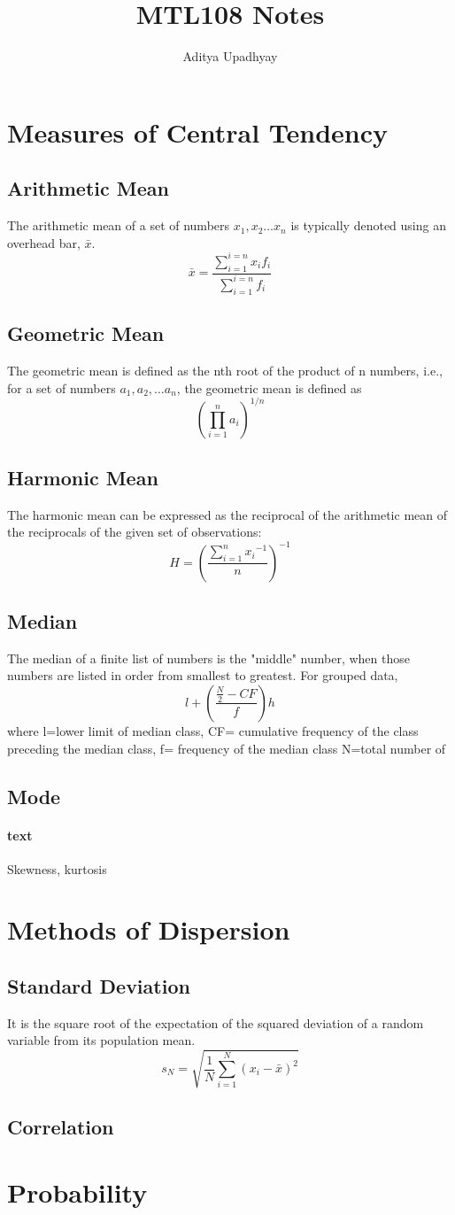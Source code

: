 \documentclass[12pt]{article}
\title{MTL108 Notes}
\author{Aditya Upadhyay}
\date{}
\begin{document}
\maketitle
\section{Measures of Central Tendency}
\subsection{Arithmetic Mean}
The arithmetic mean of a set of numbers $x_1, x_2 \dots x_n$ is typically denoted using an overhead bar, $\bar {x}$.
\[\bar{x} = \frac{ \sum_{i=1}^{i=n} {x_i}{f_i} }{\sum_{i=1}^{i=n} f_i} \]

\subsection{Geometric Mean}
The geometric mean is defined as the nth root of the product of n numbers, i.e., for a set of numbers $a_1, a_2, \dots a_n$, the geometric mean is defined as
\[ {\left( \prod_{i=1}^{n} a_i \right)}^{1/n} \]

\subsection{Harmonic Mean}
The harmonic mean can be expressed as the reciprocal of the arithmetic mean of the reciprocals of the given set of observations:
\[ H= {\left( \frac{\sum_{i=1}^{n} {x_i}^{-1} }{n}\right)}^{-1}\]

\subsection{Median}
The median of a finite list of numbers is the "middle" number, when those numbers are listed in order from smallest to greatest.
For grouped data, \[ l + \left(\frac{\frac{N}{2}-CF}{f}\right)h\]
where l=lower limit of median class,
    CF= cumulative frequency of the class preceding the median class,
    f= frequency of the median class
    N=total number of 

\subsection{Mode}
\paragraph{text}
Skewness, kurtosis
\newpage
\section{Methods of Dispersion}
\subsection{Standard Deviation}
It is the square root of the expectation of the squared deviation of a random variable from its population mean.
\[ s_N= \sqrt{\frac{1}{N} \sum_{i=1}^{N} {(x_i - \bar{x})}^2 }\]
\subsection{Correlation}

\section{Probability}
\end{document}
